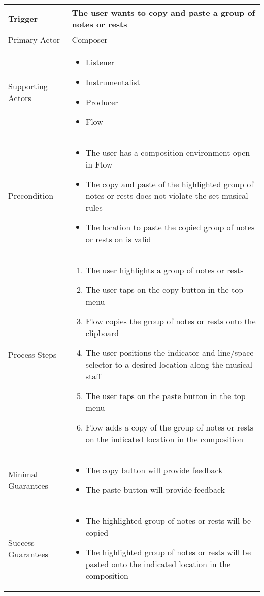 \begin{longtable}{|X|X|}
\hline
Trigger & 
The user wants to copy and paste a group of notes or rests\\
\hline
Primary Actor & 
Composer \\
\hline
Supporting Actors & 
\begin{itemize}
\item Listener
\item Instrumentalist
\item Producer
\item Flow
\end{itemize} \\
\hline
Precondition & 
\begin{itemize}
\item The user has a composition environment open in Flow
\item The copy and paste of the highlighted group of notes or rests does not violate the set musical rules
\item The location to paste the copied group of notes or rests on is valid
\end{itemize} \\
\hline
Process Steps & 
\begin{enumerate}
\item The user highlights a group of notes or rests
\item The user taps on the copy button in the top menu
\item Flow copies the group of notes or rests onto the clipboard
\item The user positions the indicator and line/space selector to a desired location along the musical staff
\item The user taps on the paste button in the top menu
\item Flow adds a copy of the group of notes or rests on the indicated location in the composition
\end{enumerate} \\
\hline
Minimal Guarantees & 
\begin{itemize}
  \item The copy button will provide feedback
  \item The paste button will provide feedback
\end{itemize} \\
\hline
Success Guarantees & 
\begin{itemize}
  \item The highlighted group of notes or rests will be copied
  \item The highlighted group of notes or rests will be pasted onto the indicated location in the composition
\end{itemize} \\
\hline
\end{longtable}